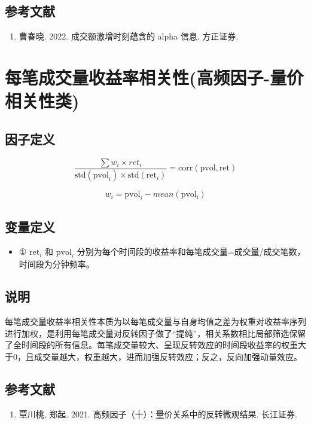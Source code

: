 \documentclass{article}
\begin{document}
\subsection{参考文献}
\begin{enumerate}
    \item 曹春晓. 2022. 成交额激增时刻蕴含的 alpha 信息. 方正证券.
\end{enumerate}

\section{每笔成交量收益率相关性(高频因子-量价相关性类)}

\subsection{因子定义}
\begin{equation}
     \frac{\sum w_i \times ret_i}{\mathrm{std}(\mathrm{pvol}_i) \times \mathrm{std}(\mathrm{ret}_i)} = \mathrm{corr}(\mathrm{pvol}, \mathrm{ret})
\end{equation}

\begin{equation}
     w_i = \mathrm{pvol}_i - mean(\mathrm{pvol_i})
\end{equation}

\subsection{变量定义}
\begin{itemize}
    \item ① \(\mathrm{ret}_i\) 和 \(\mathrm{pvol}_i\) 分别为每个时间段的收益率和每笔成交量=成交量/成交笔数，时间段为分钟频率。
\end{itemize}

\subsection{说明}
每笔成交量收益率相关性本质为以每笔成交量与自身均值之差为权重对收益率序列进行加权，是利用每笔成交量对反转因子做了“提纯”，相关系数相比局部筛选保留了全时间段的所有信息。每笔成交量较大、呈现反转效应的时间段收益率的权重大于0，且成交量越大，权重越大，进而加强反转效应；反之，反向加强动量效应。

\subsection{参考文献}
\begin{enumerate}
    \item 覃川桃, 郑起. 2021. 高频因子（十）：量价关系中的反转微观结果. 长江证券.
\end{enumerate}
\end{document}
